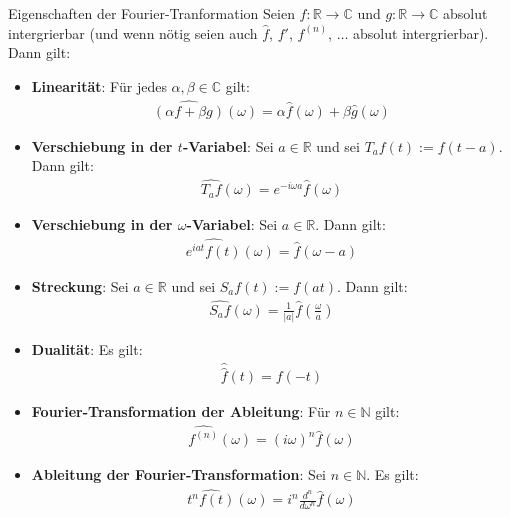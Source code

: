\documentclass[a4paper,10pt]{article}
\begin{document}
\begin{mainbox}{Eigenschaften der Fourier-Tranformation}
  Seien \(f\colon\mathbb{R}\to\mathbb{C}\) und \(g\colon\mathbb{R}\to\mathbb{C}\) absolut intergrierbar (und wenn nötig seien auch \(\hat{f}\), \(f'\), \(f^{( n )}\), \(\dots\) absolut intergrierbar). Dann gilt:
  \begin{itemize}
    \item{
      \textbf{Linearität}: Für jedes \(\alpha,\beta \in \mathbb{C}\) gilt: \begin{align*} \widehat{(\alpha f + \beta g)}(\omega ) = \alpha \hat{f}(\omega ) + \beta \hat{g}(\omega ) \end{align*}
    }
    \item{
      \textbf{Verschiebung in der \(t\)-Variabel}: Sei \(a \in \mathbb{R}\) und sei \(T_af(t):=f(t-a)\). Dann gilt: \begin{align*} \widehat{T_af}(\omega ) = e^{- i \omega a} \hat{f}(\omega )  \end{align*}
    }
    \item{
      \textbf{Verschiebung in der \(\omega\)-Variabel}: Sei \(a \in \mathbb{R}\). Dann gilt: \begin{align*} \widehat{e^{ i at} f(t)}(\omega ) = \hat{f}(\omega -a) \end{align*}
    }
    \item{
      \textbf{Streckung}: Sei \(a\in\mathbb{R}\) und sei \(S_af(t):=f(at)\). Dann gilt: \begin{align*} \widehat{S_af}(\omega ) = \frac{1}{|a|} \hat{f}\left(\frac{\omega }{a}\right) \end{align*}
    }
    \item{
      \textbf{Dualität}: Es gilt: \begin{align*} \hat{\hat{f}}(t) = f(-t) \end{align*}
    }
    \item{
      \textbf{Fourier-Transformation der Ableitung}: Für \(n\in\mathbb{N}\) gilt: \begin{align*} \widehat{f^{( n )}}(\omega ) = ( i \omega )^n \hat{f}(\omega ) \end{align*}
    }
    \item{
      \textbf{Ableitung der Fourier-Transformation}: Sei \(n\in\mathbb{N}\). Es gilt: \begin{align*} \widehat{t^n f(t)}(\omega ) = i^n \frac{d^n}{d\omega ^n} \hat{f}(\omega ) \end{align*}
    }
  \end{itemize}
\end{mainbox}
\end{document}
